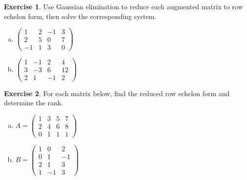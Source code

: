 \documentclass[11pt]{article}
\theoremstyle{definition}
\newtheorem{exercise}{Exercise}
\begin{document}
\begin{exercise}
Use Gaussian elimination to reduce each augmented matrix to row echelon form, then solve the corresponding system.
\begin{enumerate}[(a)]
  \item $\left(\begin{array}{ccc|c}
    1 & 2 & -1 & 3 \\
    2 & 5 & 0  & 7 \\
    -1 & 1 & 3 & 0
  \end{array}\right)$

  \item $\left(\begin{array}{ccc|c}
    1 & -1 & 2  & 4 \\
    3 & -3 & 6  & 12 \\
    2 & 1  & -1 & 2
  \end{array}\right)$
\end{enumerate}
\end{exercise}

\begin{exercise}
For each matrix below, find the reduced row echelon form and determine the rank.
\begin{enumerate}[(a)]
  \item $A = \begin{pmatrix} 1 & 3 & 5 & 7 \\ 2 & 4 & 6 & 8 \\ 0 & 1 & 1 & 1 \end{pmatrix}$

  \item $B = \begin{pmatrix} 1 & 0 & 2 \\ 0 & 1 & -1 \\ 2 & 1 & 3 \\ 1 & -1 & 3 \end{pmatrix}$
\end{enumerate}
\end{exercise}
\end{document}
